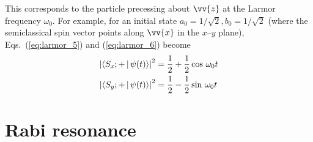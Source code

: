%
This corresponds to the particle precessing about $\vv{z}$ at the Larmor frequency $\omega_0$. For example, for an initial state $a_0=1/\sqrt{2}, b_0=1/\sqrt{2}$ (where the semiclassical spin vector points along $\vv{x}$ in the $x$--$y$ plane), Eqs.~(\ref{eq:larmor_5}) and (\ref{eq:larmor_6}) become
%
\begin{align}
    \left| \Braket{S_x;+ | \psi(t)} \right|^2&= \frac{1}{2} + \frac{1}{2}\cos\,\omega_0t \\
    \left| \Braket{S_y;+ | \psi(t)} \right|^2&= \frac{1}{2} - \frac{1}{2}\sin\,\omega_0t 
\end{align}


\section{Rabi resonance\label{sec:rabi}}


